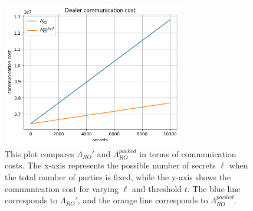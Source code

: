 \begin{figure}[t!]
  \centering
  \includegraphics[width=0.7\textwidth]{figures/3pvss_communication_cost.png}
  \caption{This plot compares $\Lambda_{RO}'$ and $\Lambda_{RO}^{packed}$ in terms of communication costs. 
  The x-axis represents the possible number of secrets $\ell$ when the total number of parties 
  is fixed, while the y-axis shows the communication cost for varying $\ell$ and threshold $t$. 
  The blue line corresponds to $\Lambda_{RO}'$, and the orange line corresponds to $\Lambda_{RO}^{packed}$.}
  \label{fig:3pvss_communication_cost}
\end{figure}